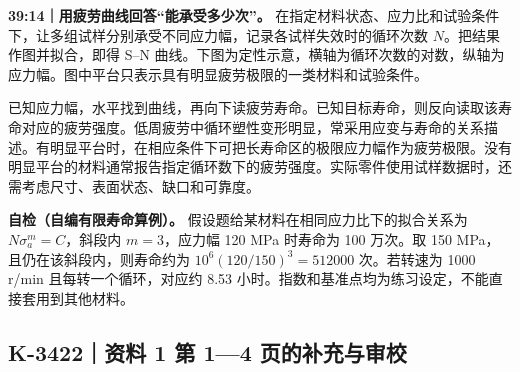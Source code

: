 \documentclass[zihao=5,a4paper,UTF8,fontset=fandol]{ctexart}
\begin{document}
\textbf{39:14｜用疲劳曲线回答“能承受多少次”。} 在指定材料状态、应力比和试验条件下，让多组试样分别承受不同应力幅，记录各试样失效时的循环次数 $N$。把结果作图并拟合，即得 S–N 曲线。下图为定性示意，横轴为循环次数的对数，纵轴为应力幅。图中平台只表示具有明显疲劳极限的一类材料和试验条件。


\begin{center}
\end{center}


已知应力幅，水平找到曲线，再向下读疲劳寿命。已知目标寿命，则反向读取该寿命对应的疲劳强度。低周疲劳中循环塑性变形明显，常采用应变与寿命的关系描述。有明显平台时，在相应条件下可把长寿命区的极限应力幅作为疲劳极限。没有明显平台的材料通常报告指定循环数下的疲劳强度。实际零件使用试样数据时，还需考虑尺寸、表面状态、缺口和可靠度。


\textbf{自检（自编有限寿命算例）。} 假设题给某材料在相同应力比下的拟合关系为 $N\sigma_a^m=C$，斜段内 $m=3$，应力幅 120 MPa 时寿命为 100 万次。取 150 MPa，且仍在该斜段内，则寿命约为 $10^6(120/150)^3=512000$ 次。若转速为 1000 r/min 且每转一个循环，对应约 8.53 小时。指数和基准点均为练习设定，不能直接套用到其他材料。





\subsection{K-3422｜资料 1 第 1—4 页的补充与审校}
\label{k-3422}
\end{document}
